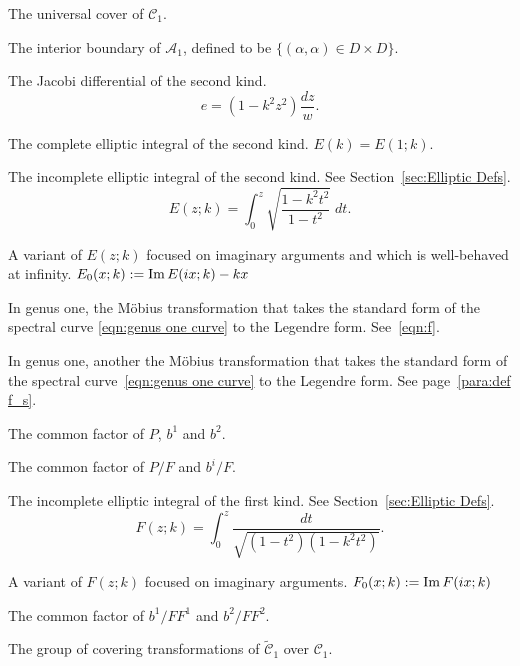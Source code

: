 \begin{description}[align=right]
\item[$\mathcal{\tilde{C}}_1$] The universal cover of $\mathcal{C}_1$.

\item[$\mathcal{D}$] The interior boundary of $\mathcal{A}_1$, defined to be $\{ (α,α) \in D \times D\}$.

\item[$e$] The Jacobi differential of the second kind.
\[
e = (1-k^2z^2) \frac{dz}{w}.
\]

\item[$E(k)$] The complete elliptic integral of the second kind. $E(k) = E(1;k)$.

\item[$E(z;k)$] The incomplete elliptic integral of the second kind. See Section~\ref{sec:Elliptic Defs}.
\[
E(z;k) = \int_0^z \sqrt{\frac{1-k^2 t^2}{1-t^2}} \;dt.
\]

\item[$E_0(x;k)$] A variant of $E(z;k)$ focused on imaginary arguments and which is well-behaved at infinity. $E_0 (x ; k) := \operatorname{Im} E(i x; k) - kx$

\item[$f(ζ)$] In genus one, the M\"obius transformation that takes the standard form of the spectral curve \eqref{eqn:genus one curve} to the Legendre form. See~\eqref{eqn:f}.

\item[$f_s(ζ)$] In genus one, another the M\"obius transformation that takes the standard form of the spectral curve~\eqref{eqn:genus one curve} to the Legendre form. See page~\ref{para:def f_s}.

\item[$F$] The common factor of $P$, $b^1$ and $b^2$.
\item[$F^i$] The common factor of $P/F$ and $b^i/F$.

\item[$F(z;k)$] The incomplete elliptic integral of the first kind. See Section~\ref{sec:Elliptic Defs}.
\[
F(z;k) = \int_0^z \frac{dt}{\sqrt{(1-t^2)(1-k^2 t^2)}}.
\]

\item[$F_0(x;k)$] A variant of $F(z;k)$ focused on imaginary arguments. $F_0 (x ; k) := \operatorname{Im} F(i x; k)$

\item[$G$] The common factor of $b^1/FF^1$ and $b^2/FF^2$.

\item[$\mathcal{G}$] The group of covering transformations of $\mathcal{\tilde{C}}_1$ over $\mathcal{C}_1$.


\end{description}
